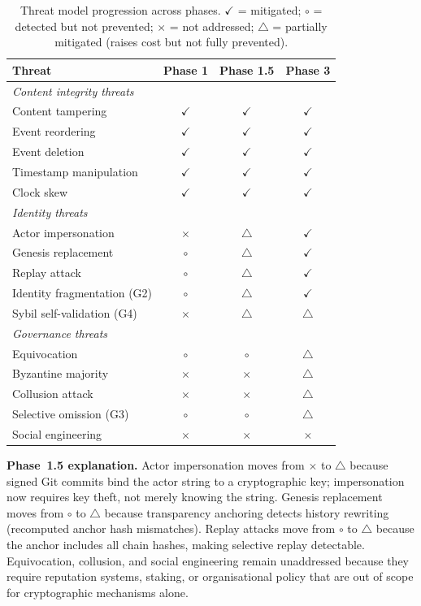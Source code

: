 \begin{table}[htbp]
\centering
\caption{Threat model progression across phases. $\checkmark$ = mitigated; $\circ$ = detected but not prevented; $\times$ = not addressed; $\triangle$ = partially mitigated (raises cost but not fully prevented).}
\label{tab:threat-model-full}
\begin{tabular}{@{}lccc@{}}
\toprule
\textbf{Threat} & \textbf{Phase 1} & \textbf{Phase 1.5} & \textbf{Phase 3} \\
\midrule
\multicolumn{4}{l}{\textit{Content integrity threats}} \\
Content tampering & $\checkmark$ & $\checkmark$ & $\checkmark$ \\
Event reordering & $\checkmark$ & $\checkmark$ & $\checkmark$ \\
Event deletion & $\checkmark$ & $\checkmark$ & $\checkmark$ \\
Timestamp manipulation & $\checkmark$ & $\checkmark$ & $\checkmark$ \\
Clock skew & $\checkmark$ & $\checkmark$ & $\checkmark$ \\
\midrule
\multicolumn{4}{l}{\textit{Identity threats}} \\
Actor impersonation & $\times$ & $\triangle$ & $\checkmark$ \\
Genesis replacement & $\circ$ & $\triangle$ & $\checkmark$ \\
Replay attack & $\circ$ & $\triangle$ & $\checkmark$ \\
Identity fragmentation (G2) & $\circ$ & $\triangle$ & $\checkmark$ \\
Sybil self-validation (G4) & $\times$ & $\triangle$ & $\triangle$ \\
\midrule
\multicolumn{4}{l}{\textit{Governance threats}} \\
Equivocation & $\circ$ & $\circ$ & $\triangle$ \\
Byzantine majority & $\times$ & $\times$ & $\triangle$ \\
Collusion attack & $\times$ & $\times$ & $\triangle$ \\
Selective omission (G3) & $\circ$ & $\circ$ & $\triangle$ \\
Social engineering & $\times$ & $\times$ & $\times$ \\
\bottomrule
\end{tabular}
\end{table}

\textbf{Phase~1.5 explanation.} Actor impersonation moves from $\times$ to $\triangle$ because signed Git commits bind the actor string to a cryptographic key; impersonation now requires key theft, not merely knowing the string. Genesis replacement moves from $\circ$ to $\triangle$ because transparency anchoring detects history rewriting (recomputed anchor hash mismatches). Replay attacks move from $\circ$ to $\triangle$ because the anchor includes all chain hashes, making selective replay detectable. Equivocation, collusion, and social engineering remain unaddressed because they require reputation systems, staking, or organisational policy that are out of scope for cryptographic mechanisms alone.

